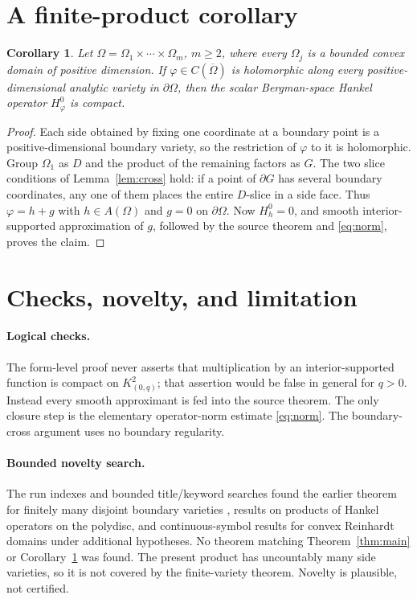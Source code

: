 \documentclass[11pt]{article}
\newtheorem{corollary}{Corollary}
\newcommand{\bd}{\partial}
\newcommand{\cl}[1]{\overline{#1}}
\begin{document}
\section{A finite-product corollary}

\begin{corollary}\label{cor:finite}
Let $\Omega=\Omega_1\times\cdots\times\Omega_m$, $m\geq2$, where every
$\Omega_j$ is a bounded convex domain of positive dimension.  If
$\varphi\in C(\cl\Omega)$ is holomorphic along every positive-dimensional
analytic variety in $\bd\Omega$, then the scalar Bergman-space Hankel
operator $H_\varphi^0$ is compact.
\end{corollary}

\begin{proof}
Each side obtained by fixing one coordinate at a boundary point is a
positive-dimensional boundary variety, so the restriction of $\varphi$ to
it is holomorphic.  Group $\Omega_1$ as $D$ and the product of the remaining
factors as $G$.  The two slice conditions of Lemma~\ref{lem:cross} hold:
if a point of $\bd G$ has several boundary coordinates, any one of them
places the entire $D$-slice in a side face.  Thus
$\varphi=h+g$ with $h\in A(\Omega)$ and $g=0$ on $\bd\Omega$.
Now $H_h^0=0$, and smooth interior-supported approximation of $g$, followed
by the source theorem and \eqref{eq:norm}, proves the claim.
\end{proof}

\section{Checks, novelty, and limitation}

\paragraph{Logical checks.}
The form-level proof never asserts that multiplication by an
interior-supported function is compact on $K^2_{(0,q)}$; that assertion would
be false in general for $q>0$.  Instead every smooth approximant is fed into
the source theorem.  The only closure step is the elementary operator-norm
estimate \eqref{eq:norm}.  The boundary-cross argument uses no boundary
regularity.

\paragraph{Bounded novelty search.}
The run indexes and bounded title/keyword searches found the earlier theorem
for finitely many disjoint boundary varieties \cite{CSS20}, results on
products of Hankel operators on the polydisc, and continuous-symbol results
for convex Reinhardt domains under additional hypotheses.  No theorem
matching Theorem~\ref{thm:main} or Corollary~\ref{cor:finite} was found.
The present product has uncountably many side varieties, so it is not covered
by the finite-variety theorem.  Novelty is plausible, not certified.
\end{document}
